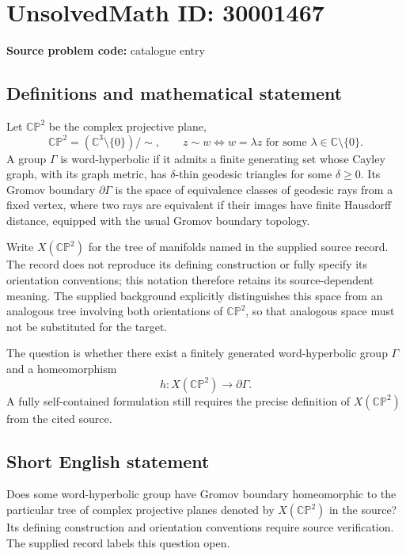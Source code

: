 \documentclass[11pt]{article}
\newcommand{\C}{\mathbb{C}}
\begin{document}
\section*{UnsolvedMath ID: 30001467}
\textbf{Source problem code:} catalogue entry
\subsection{Definitions and mathematical statement}
Let \(\mathbb{CP}^{2}\) be the complex projective plane,
\[
\mathbb{CP}^{2}=(\C^{3}\setminus\{0\})/\sim,
\qquad z\sim w\iff w=\lambda z\text{ for some }\lambda\in\C\setminus\{0\}.
\]
A group \(\Gamma\) is word-hyperbolic if it admits a finite generating set whose Cayley graph, with its graph metric, has \(\delta\)-thin geodesic triangles for some \(\delta\geq 0\). Its Gromov boundary \(\partial\Gamma\) is the space of equivalence classes of geodesic rays from a fixed vertex, where two rays are equivalent if their images have finite Hausdorff distance, equipped with the usual Gromov boundary topology.

Write \(X(\mathbb{CP}^{2})\) for the tree of manifolds named in the supplied source record. The record does not reproduce its defining construction or fully specify its orientation conventions; this notation therefore retains its source-dependent meaning. The supplied background explicitly distinguishes this space from an analogous tree involving both orientations of \(\mathbb{CP}^{2}\), so that analogous space must not be substituted for the target.

The question is whether there exist a finitely generated word-hyperbolic group \(\Gamma\) and a homeomorphism
\[
h\colon X(\mathbb{CP}^{2})\longrightarrow\partial\Gamma.
\]
A fully self-contained formulation still requires the precise definition of \(X(\mathbb{CP}^{2})\) from the cited source.
\subsection{Short English statement}
Does some word-hyperbolic group have Gromov boundary homeomorphic to the particular tree of complex projective planes denoted by \(X(\mathbb{CP}^{2})\) in the source? Its defining construction and orientation conventions require source verification. The supplied record labels this question open.
\end{document}
